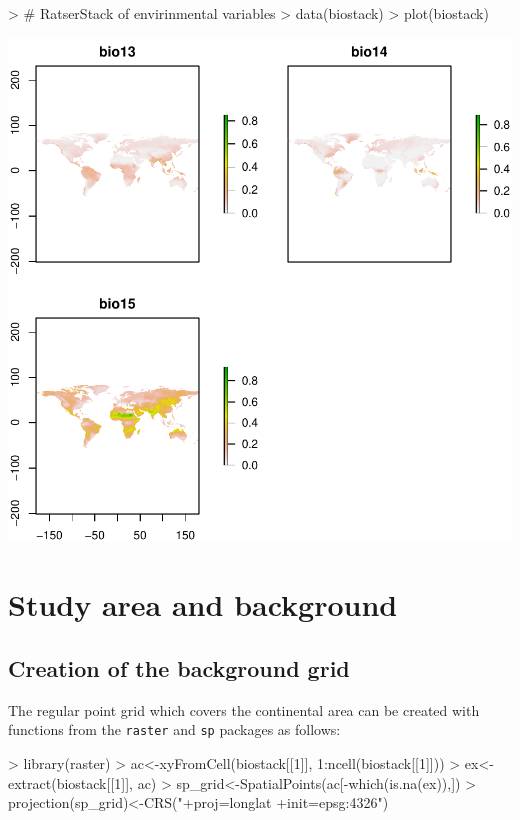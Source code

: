 \documentclass[10pt,a4paper]{report}
\begin{document}
\begin{Schunk}
\begin{Sinput}
> # RatserStack of envirinmental variables
> data(biostack)
> plot(biostack)
\end{Sinput}
\end{Schunk}
\includegraphics{mopa-mopa3}

\chapter{Study area and background}

\section{Creation of the background grid}

The regular point grid which covers the continental area can be created with functions from the \texttt{raster} and \texttt{sp} packages as follows:

\begin{Schunk}
\begin{Sinput}
> library(raster)
> ac<-xyFromCell(biostack[[1]],  1:ncell(biostack[[1]]))
> ex<-extract(biostack[[1]], ac)
> sp_grid<-SpatialPoints(ac[-which(is.na(ex)),])
> projection(sp_grid)<-CRS("+proj=longlat +init=epsg:4326")
\end{Sinput}
\end{Schunk}
\end{document}
